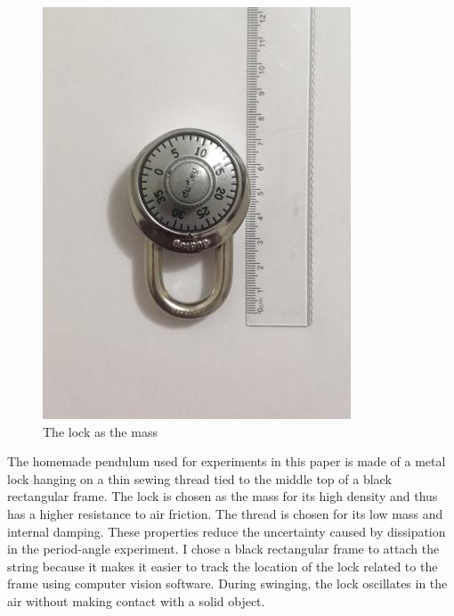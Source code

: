 \documentclass[12pt]{article}
\begin{document}
\begin{figure}[!htb]
\includegraphics[width=\linewidth]{img-lock.jpg}
\caption{The lock as the mass}\label{fig:lock}
\endminipage
\end{figure}

The homemade pendulum used for experiments in this paper is made of a metal lock hanging on a thin sewing thread tied to the middle top of a black rectangular frame. The lock is chosen as the mass for its high density and thus has a higher resistance to air friction. The thread is chosen for its low mass and internal damping. These properties reduce the uncertainty caused by dissipation in the period-angle experiment. I chose a black rectangular frame to attach the string because it makes it easier to track the location of the lock related to the frame using computer vision software. During swinging, the lock oscillates in the air without making contact with a solid object.
\end{document}
